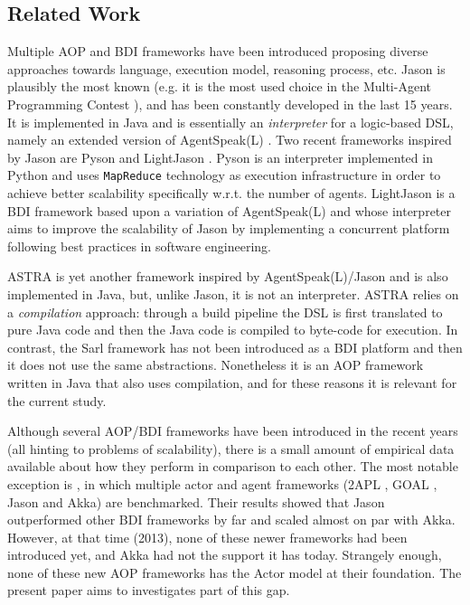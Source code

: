 \vspace{-5pt}
\subsection{Related Work}
Multiple AOP and BDI frameworks have been introduced proposing diverse approaches towards language, execution model, reasoning process, etc. Jason \cite{Bordini2005} is plausibly the most known (e.g. it is the most used choice in the Multi-Agent Programming Contest \cite{mapc}), and has been constantly developed in the last 15 years. It is implemented in Java and is essentially an \textit{interpreter} for a logic-based DSL, namely an extended version of AgentSpeak(L) \cite{RaoAS1996}.  Two recent frameworks inspired by Jason are Pyson \cite{pyson} and LightJason \cite{LJ}. Pyson is an interpreter implemented in Python and uses \verb+MapReduce+ technology as execution infrastructure in order to achieve better scalability specifically w.r.t. the number of agents. LightJason is a BDI framework based upon a variation of AgentSpeak(L) and whose interpreter aims to improve the scalability of Jason by implementing a concurrent platform following best practices in software engineering.

ASTRA \cite{Astra} is yet another framework inspired by AgentSpeak(L)/Jason and is also implemented in Java, but, unlike Jason, it is not an interpreter. ASTRA relies on a \textit{compilation} approach: through a build pipeline the DSL is first translated to pure Java code and then the Java code is compiled to byte-code for execution. In contrast, the Sarl \cite{Sarl} framework has not been introduced as a BDI platform and then it does not use the same abstractions. Nonetheless it is an AOP framework written in Java that also uses compilation, and for these reasons it is relevant for the current study.


Although several AOP/BDI frameworks have been introduced in the recent years (all hinting to problems of scalability), there is a small amount of empirical data available about how they perform in comparison to each other. The most notable exception is  \cite{Cardoso2013}, in which multiple actor and agent frameworks (2APL \cite{Dastani2APL}, GOAL \cite{Hindriks2009a}, Jason and Akka) are benchmarked. Their results showed that Jason outperformed other BDI frameworks by far and scaled almost on par with Akka. However, at that time (2013), none of these newer frameworks had been introduced yet, and Akka had not the support it has today. Strangely enough, none of these new AOP frameworks has the Actor model at their foundation. The present paper aims to investigates part of this gap.

